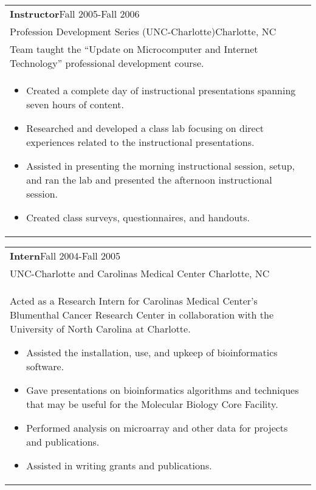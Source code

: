 \documentclass[12pt]{report}
\newenvironment{detailsList}
{\begin{itemize}
  \setlength{\itemsep}{1pt}
  \setlength{\parskip}{0pt}
  \setlength{\parsep}{0pt}
  \setlength{\partopsep}{0pt}
  \setlength{\topsep}{0pt}}
{\end{itemize}}
\def\fullLength{6.5in}
\begin{document}
\vspace{-7.0mm}

\begin{table}[!h]
\begin{tabular}{p{\fullLength}}
\textbf{Instructor}\hfill Fall 2005-Fall 2006\\
Profession Development Series (UNC-Charlotte)\hfill Charlotte, NC\\
Team taught the ``Update on Microcomputer and Internet Technology'' professional development course.\\
\begin{detailsList}
\item Created a complete day of instructional presentations spanning seven hours of content.
\item Researched and developed a class lab focusing on direct experiences related to the instructional presentations.
\item Assisted in presenting the morning instructional session, setup, and ran the lab and presented the afternoon instructional session.
\item Created class surveys, questionnaires, and handouts.
\end{detailsList}
\end{tabular}
\end{table}

\clearpage

\begin{table}[!h]
\begin{tabular}{p{\fullLength}}
\textbf{Intern}\hfill Fall 2004-Fall 2005\\
UNC-Charlotte and Carolinas Medical Center \hfill Charlotte, NC\\
Acted as a Research Intern for Carolinas Medical Center’s Blumenthal Cancer Research Center in collaboration with the University of North Carolina at Charlotte.
\begin{detailsList}
\item Assisted the installation, use, and upkeep of bioinformatics software.
\item Gave presentations on bioinformatics algorithms and techniques that may be useful for the Molecular Biology Core Facility.
\item Performed analysis on microarray and other data for projects and publications.
\item Assisted in writing grants and publications.
\end{detailsList}
\end{tabular}
\end{table}
\end{document}
